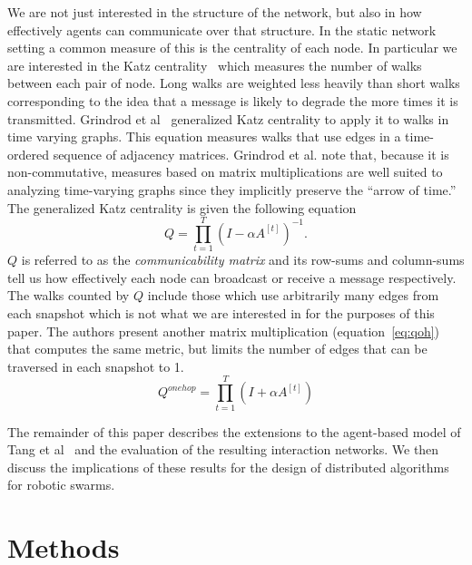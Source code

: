\documentclass[conference]{IEEEtran}
\newcommand{\adj}[1]{A^{[#1]}}
\begin{document}
We are not just interested in the structure of the network, but also
in how effectively agents can communicate over that structure. In the
static network setting a common measure of this is the centrality of
each node. In particular we are interested in the Katz
centrality~\cite{Newman2010} which measures the number of walks
between each pair of node. Long walks are weighted less heavily than
short walks corresponding to the idea that a message is likely to
degrade the more times it is transmitted. Grindrod et
al~\cite{Grindrod2011} generalized Katz centrality to apply it to
walks in time varying graphs. This equation measures walks that use
edges in a time-ordered sequence of adjacency matrices. Grindrod et
al. note that, because it is non-commutative, measures based on matrix
multiplications are well suited to analyzing time-varying graphs since
they implicitly preserve the ``arrow of time.'' The generalized Katz
centrality is given the following equation
\begin{equation}
  Q = \prod_{t = 1}^T(I - \alpha \adj{t})^{-1}.
  \label{eq:q}
\end{equation}
$Q$ is referred to as the \emph{communicability matrix} and its
row-sums and column-sums tell us how effectively each node can
broadcast or receive a message respectively. The walks counted by $Q$
include those which use arbitrarily many edges from each snapshot
which is not what we are interested in for the purposes of this
paper. The authors present another matrix multiplication
(equation~\ref{eq:qoh}) that computes the same metric, but limits the
number of edges that can be traversed in each snapshot to 1.
\begin{equation}
  Q^{onehop} = \prod_{t = 1}^T(I + \alpha \adj{t})
  \label{eq:qoh}
\end{equation}

The remainder of this paper describes the extensions to the
agent-based model of Tang et al~\cite{Tang2010} and the evaluation of
the resulting interaction networks. We then discuss the implications
of these results for the design of distributed algorithms for robotic
swarms.

\section{Methods}
\label{sec:methods}
\end{document}

